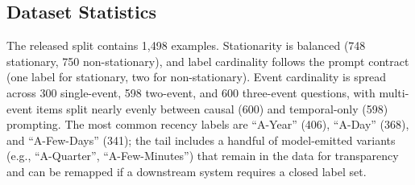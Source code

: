 \subsection{Dataset Statistics}
The released split contains 1{,}498 examples. Stationarity is balanced (748 stationary, 750 non-stationary), and label cardinality follows the prompt contract (one label for stationary, two for non-stationary). Event cardinality is spread across 300 single-event, 598 two-event, and 600 three-event questions, with multi-event items split nearly evenly between causal (600) and temporal-only (598) prompting. The most common recency labels are ``A-Year'' (406), ``A-Day'' (368), and ``A-Few-Days'' (341); the tail includes a handful of model-emitted variants (e.g., ``A-Quarter'', ``A-Few-Minutes'') that remain in the data for transparency and can be remapped if a downstream system requires a closed label set.